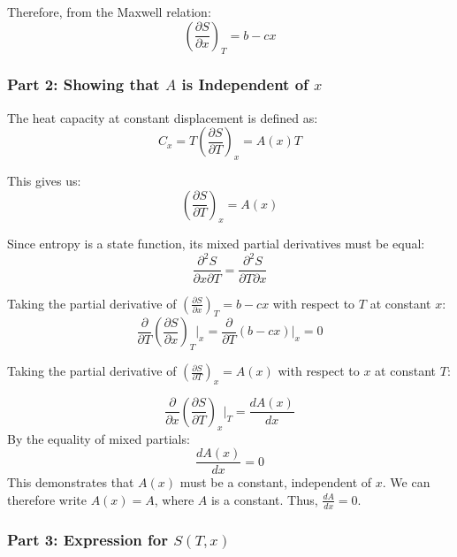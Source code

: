 \documentclass[10pt,twocoloumn]{article}
\begin{document}
Therefore, from the Maxwell relation:
\begin{equation}
    \boxed{\left(\frac{\partial S}{\partial x}\right)_T = b - cx}
\end{equation}

\subsubsection*{Part 2: Showing that $A$ is Independent of $x$}

The heat capacity at constant displacement is defined as:
\begin{equation}
    C_x = T\left(\frac{\partial S}{\partial T}\right)_x = A(x)T
\end{equation}

This gives us:
\begin{equation}
    \left(\frac{\partial S}{\partial T}\right)_x = A(x)
\end{equation}

Since entropy is a state function, its mixed partial derivatives must be equal:
\begin{equation}
\frac{\partial^2 S}{\partial x \partial T} = \frac{\partial^2 S}{\partial T \partial x}
\end{equation}

Taking the partial derivative of $\left(\frac{\partial S}{\partial x}\right)_T = b - cx$ with respect to $T$ at constant $x$:
\begin{equation}
    \frac{\partial}{\partial T}\left(\frac{\partial S}{\partial x}\right)_T \bigg|_x = \frac{\partial}{\partial T}(b - cx)\bigg|_x = 0
\end{equation}

Taking the partial derivative of $\left(\frac{\partial S}{\partial T}\right)_x = A(x)$ with respect to $x$ at constant $T$:

\begin{equation}
    \frac{\partial}{\partial x}\left(\frac{\partial S}{\partial T}\right)_x \bigg|_T = \frac{dA(x)}{dx}
\end{equation}
By the equality of mixed partials:
\begin{equation}
\frac{dA(x)}{dx} = 0
\end{equation}
This demonstrates that $A(x)$ must be a constant, independent of $x$. We can therefore write $A(x) = A$, where $A$ is a constant. Thus, $\boxed{\frac{dA}{dx} = 0}$.

\subsubsection*{Part 3: Expression for $S(T,x)$}
\end{document}

